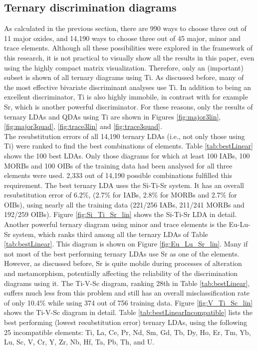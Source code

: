 \documentclass{article}
\begin{document}
\subsection{Ternary discrimination diagrams}
\label{sec:ternary}

As calculated  in the previous section,  there are 990  ways to choose
three out of  11 major oxides, and 14,190 ways to  choose three out of
45 major,  minor and trace elements. Although  all these possibilities
were explored in  the framework of this research,  it is not practical
to visually show all the results  in this paper, even using the highly
compact matrix visualization. Therefore, only an (important) subset is
shown of all  ternary diagrams using Ti. As  discussed before, many of
the  most  effective  bivariate  discriminant  analyses  use  Ti.   In
addition  to  being an  excellent  discriminator,  Ti  is also  highly
immobile, in contrast  with for example Sr, which  is another powerful
discriminator.  For  these reasons, only  the results of  ternary LDAs
and  QDAs   using  Ti   are  shown  in   Figures  \ref{fig:major3lin},
\ref{fig:major3quad}, \ref{fig:trace3lin} and \ref{fig:trace3quad}.\\

The resubstitution errors  of all 14,190 ternary LDAs  (i.e., not only
those using Ti) were ranked to find the best combinations of elements.
Table  \ref{tab:bestLinear}  shows  the  100 best  LDAs.   Only  those
diagrams for  which at least 100 IABs,  100 MORBs and 100  OIBs of the
training  data had  been analysed  for all  three elements  were used.
2,333 out of 14,190  possible combinations fulfilled this requirement.
The  best ternary  LDA uses  the Si-Ti-Sr  system. It  has  an overall
resubstitution error  of 6.2\%, (2.7\%  for IABs, 2.8\% for  MORBs and
2.7\% for  OIBs), using  nearly all the  training data  (221/256 IABs,
211/241 MORBs and  192/259 OIBs).  Figure \ref{fig:Si_Ti_Sr_lin} shows
the  Si-Ti-Sr LDA in  detail. Another  powerful ternary  diagram using
minor and  trace elements  is the Eu-Lu-Sr  system, which  ranks third
among  all  the  ternary  LDAs of  Table  \ref{tab:bestLinear}.   This
diagram is  shown on Figure \ref{fig:Eu_Lu_Sr_lin}.  Many  if not most
of the  best performing ternary  LDAs use Sr  as one of  the elements.
However, as discussed  before, Sr is quite mobile  during processes of
alteration and metamorphism,  potentially affecting the reliability of
the discrimination  diagrams using  it.  The Ti-V-Sc  diagram, ranking
28th  in  Table  \ref{tab:bestLinear},  suffers much  less  from  this
problem and still has an overall misclassification rate of only 10.4\%
while using 374 out of 756 training data. Figure \ref{fig:V_Ti_Sc_lin}
shows      the     Ti-V-Sc      diagram     in      detail.      Table
\ref{tab:bestLinearIncompatible}  lists  the  best performing  (lowest
resubstitution   error)   ternary  LDAs,   using   the  following   25
incompatible elements: Ti, La, Ce, Pr, Nd, Sm, Gd, Tb, Dy, Ho, Er, Tm,
Yb, Lu, Sc, V, Cr, Y, Zr, Nb, Hf, Ta, Pb, Th, and U.\\
\end{document}
